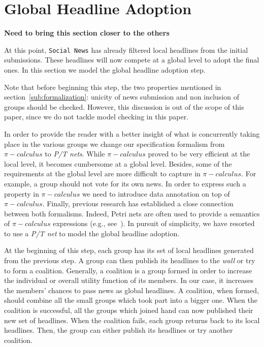 \section{Global Headline Adoption} %
\label{sec:global_headline_adoption}

\textbf{Need to bring this section closer to the others}

At this point, {\tt Social News} has already filtered local headlines from the initial submissions. These headlines will
now compete at a global level to adopt the final ones. In this section we model the global headline adoption step.

Note that before beginning this step, the two properties mentioned in section~\ref{sub:formalization}: unicity of news
submission and non inclusion of groups should be checked. However, this discussion is out of the scope of this paper,
since we do not tackle model checking in this paper.

In order to provide the reader with a better insight of what is concurrently taking place in the various groups we change
our specification formalism from $\pi-calculus$ to \emph{P/T nets}. While $\pi-calculus$ proved to be very efficient at
the local level, it becomes cumbersome at a global level. Besides, some of the requirements at the global level are more
difficult to capture in $\pi-calculus$. For example, a group should not vote for its own news. In order to express such a
property in $\pi-calculus$ we need to introduce data annotation on top of $\pi-calculus$. Finally, previous research has
established a close connection between both formalisms. Indeed, Petri nets are often used to provide a semantics of
$\pi-calculus$ expressions (e.g., see~\cite{Devillers-Klaudel-Koutny:06}). In pursuit of simplicity, we have resorted to
use a \emph{P/T net} to model the global headline adoption.

At the beginning of this step, each group has its set of local headlines generated from the previous step. A group can
then publish its headlines to the \emph{wall} or try to form a coalition. Generally, a coalition is a group formed in
order to increase the individual or overall utility function of its members. In our case, it increases the members'
chances to pass news as global headlines. A coalition, when formed, should combine all the small groups which took part
into a bigger one. When the coalition is successful, all the groups which joined hand can now published their new set of
headlines. When the coalition fails, each group returns back to its local headlines. Then, the group can either publish
its headlines or try another coalition.

